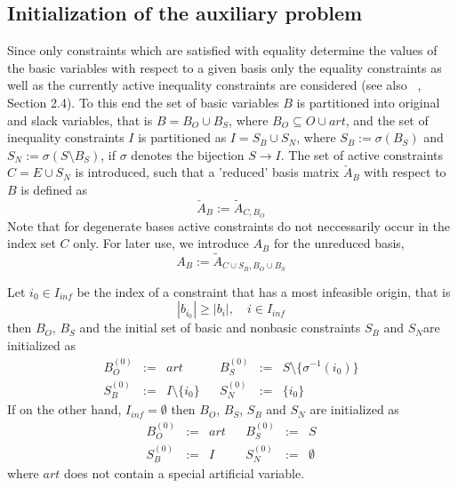 \documentclass[a4paper]{article}
\begin{document}
\subsection{Initialization of the auxiliary problem}
Since only constraints which are satisfied with equality determine the values of
the basic variables with respect to a given basis only the equality constraints
as well as the currently active inequality constraints are
considered (see also ~\cite{Sven}, Section 2.4).
To this end the set of basic variables $B$ is partitioned into original and
slack variables, that is
$B=B_{O} \cup B_{S}$, where $B_O \subseteq O \cup art$,
and the set of inequality constraints $I$ is partitioned as
$I=S_{B} \cup S_{N}$, where $S_{B}:=\sigma(B_{S})$
and
$S_{N}:=\sigma(S \setminus B_{S})$, if $\sigma$ denotes the bijection
$S \rightarrow I$.
The set of active constraints
$C=E \cup S_{N}$ is
introduced, such that a 'reduced' basis matrix $\check{A}_{B}$
with respect to $B$ is defined as
\begin{equation}
\label{def:red_basis_phaseI}
 \check{A}_{B}:=\tilde{A}_{C, B_{O}}
\end{equation}
Note that for degenerate bases active constraints do not neccessarily occur in
the index set $C$ only.
For later use, we introduce $A_{B}$ for the unreduced basis,
\begin{equation}
\label{def:basis_phaseI}
  A_{B}:= \tilde{A}_{C \cup S_{B}, B_{O} \cup B_{S}}
\end{equation}

Let $i_{0} \in I_{inf}$ be the index of a constraint that has a most infeasible
origin, that is 
\[
  \left| b_{i_{0}} \right| \geq  \left|b_{i}\right|, \quad i \in I_{inf}
\]
then $B_{O}$, $B_{S}$ and the initial set of basic and nonbasic constraints
$S_{B}$ and $S_{N}$are initialized as
\begin{equation}
\begin{array}{ccccccc}
  \label{def:headings_init_io}
B_{O}^{(0)} &:=& art && B_{S}^{(0)} &:=& S \setminus
  \{\sigma^{-1}\left(i_{0}\right)\} \\
S_{B}^{(0)} &:=& I \setminus \{i_{0}\} && S_{N}^{(0)} & := & \{ i_{0} \} 
\end{array}
\end{equation}
If on the other hand, $I_{inf}=\emptyset$ then $B_{O}$, $B_{S}$, $S_{B}$ and
$S_{N}$ are initialized as
\begin{equation}
\begin{array}{ccccccc}
\label{def:headings_init_fo}
B_{O}^{(0)} &:=& art && B_{S}^{(0)} &:=& S \\
S_{B}^{(0)} &:=&I && S_{N}^{(0)}&:=& \emptyset
\end{array}
\end{equation}
where $art$ does not contain a special artificial variable.
\end{document}
